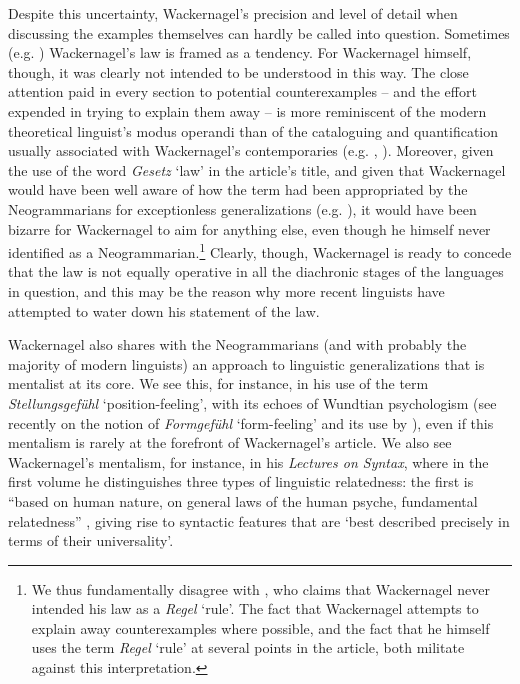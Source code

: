 \documentclass[output=paper]{../langscibook}
\begin{document}
Despite this uncertainty, Wackernagel's precision and level of detail when discussing the examples themselves can hardly be called into question. Sometimes (e.g. \citealp[24]{HarrisCampbell1995}) Wackernagel's law is framed as a tendency. For Wackernagel himself, though, it was clearly not intended to be understood in this way. The close attention paid in every section to potential counterexamples -- and the effort expended in trying to explain them away -- is more reminiscent of the modern theoretical linguist's modus operandi than of the cataloguing and quantification usually associated with Wackernagel's contemporaries (e.g. \citet{Ries1880}, \citet{Behaghel}). Moreover, given the use of the word \textit{Gesetz} `law' in the article's title, and given that Wackernagel would have been well aware of how the term had been appropriated by the Neogrammarians for exceptionless generalizations (e.g. \citealp{OsthoffBrugmann1878}), it would have been bizarre for Wackernagel to aim for anything else, even though he himself never identified as a Neogrammarian.\footnote{We thus fundamentally disagree with \citet[250--251]{AzizHanna2015}, who claims that Wackernagel never intended his law as a \textit{Regel} `rule'. The fact that Wackernagel attempts to explain away counterexamples where possible, and the fact that he himself uses the term \textit{Regel} `rule' at several points in the article, both militate against this interpretation.} Clearly, though, Wackernagel is ready to concede that the law is not equally operative in all the diachronic stages of the languages in question, and this may be the reason why more recent linguists have attempted to water down his statement of the law.

Wackernagel also shares with the Neogrammarians (and with probably the majority of modern linguists) an approach to linguistic generalizations that is mentalist at its core. We see this, for instance, in his use of the term \textit{Stellungsgefühl} `position-feeling', with its echoes of Wundtian psychologism (see recently \citealp{Fortis2019} on the notion of \textit{Formgefühl} `form-feeling' and its use by \citealp{Wundt1874}), even if this mentalism is rarely at the forefront of Wackernagel's article. We also see Wackernagel's mentalism, for instance, in his \textit{Lectures on Syntax}, where in the first volume he distinguishes three types of linguistic relatedness: the first is ``based on human nature, on general laws of the human psyche, fundamental relatedness'' \citep[11]{Langslow2009}, giving rise to syntactic features that are `best described precisely in terms of their universality'.
\end{document}

